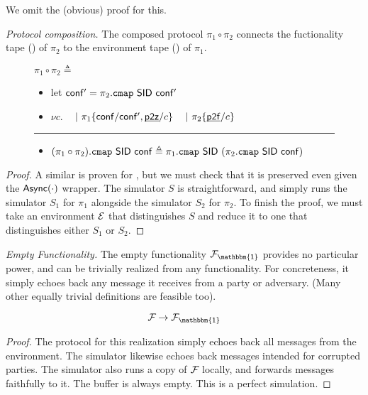 We omit the (obvious) proof for this.

\emph{Protocol composition.}
The composed protocol $\pi_1 \circ \pi_2$ connects the fuctionality tape () of $\pi_2$ to the environment tape () of $\pi_1$.

\begin{figure}[h!]
\begin{boxedminipage}{\columnwidth}
\begin{centering}
$\pi_1 \circ \pi_2 \triangleq$
\end{centering}
\small
\begin{itemize}[leftmargin=2mm]
\item[] let $\msf{conf'} = \pi_2.\mtt{cmap} ~ \msf{SID} ~\msf{conf'}$
\item[] $\nu c.$
~ $|~ \pi_1 \{\msf{conf}/\msf{conf'}, \chan{p2z}/c\}$
~ $|~ \pi_2 \{\chan{p2f}/c\}$
\end{itemize}
\hrule
\begin{itemize}[leftmargin=2mm]
\item[] $(\pi_1 \circ \pi_2).\mtt{cmap}~ \msf{SID}~ \msf{conf} \triangleq \pi_1.\mtt{cmap} ~\msf{SID}~(\pi_2.\mtt{cmap} ~\msf{SID} ~\msf{conf})$
\end{itemize}
\end{boxedminipage}
\end{figure}

\begin{theorem}
\begin{prooftree}
\end{prooftree}
\end{theorem}
\begin{proof}
A similar is proven for \SaUCy, but we must check that it is preserved even given the $\msf{Async}(\cdot)$ wrapper. The simulator $S$ is straightforward, and simply runs the simulator $S_1$ for $\pi_1$ alongside the simulator $S_2$ for $\pi_2$. To finish the proof, we must take an environment $\Z$ that distinguishes $S$ and reduce it to one that distinguishes either $S_1$ or $S_2$.
\end{proof}

\emph{Empty Functionality.}
The empty functionality $\F{\mathbbm{1}}$ provides no particular power, and can be trivially realized from any functionality. For concreteness, it simply echoes back any message it receives from a party or adversary. (Many other equally trivial definitions are feasible too).
\begin{theorem}
\[
\F{} \rightarrow \F{\mathbbm{1}}
\]
\end{theorem}
\begin{proof}
The protocol for this realization simply echoes back all messages from the environment. The simulator likewise echoes back messages intended for corrupted parties. The simulator also runs a copy of $\F{}$ locally, and forwards messages faithfully to it. The  buffer is always empty. This is a perfect simulation.
\end{proof}

